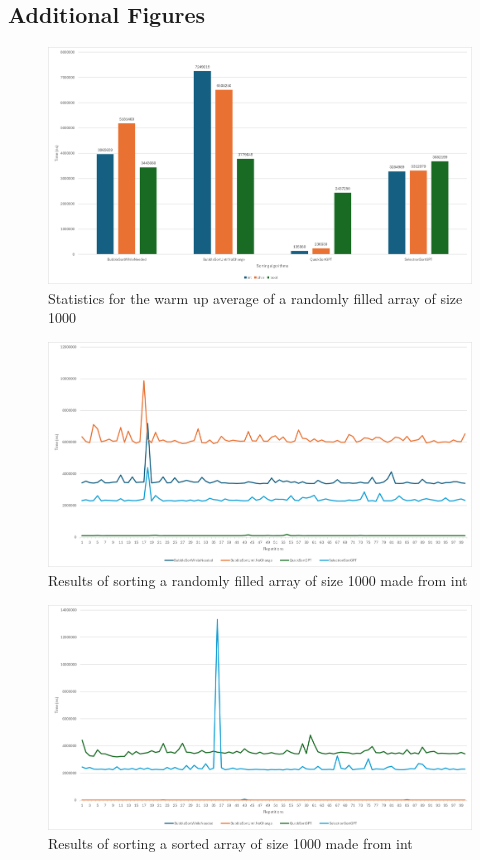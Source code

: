 \documentclass{article}
\begin{document}
\subsection{Additional Figures}\label{subchap:graphs}
\begin{figure}[!h]
    \centering
    \includegraphics[width=0.75\linewidth]{warmup_avg_1000.png}
    \caption{Statistics for the warm up average of a randomly filled array of size 1000}
    \label{fig:warmup_avg_1000_random}
\end{figure}


\begin{figure}[!h]
    \centering
    \includegraphics[width=0.7\linewidth]{int_1000_random.png}
    \caption{Results of sorting a randomly filled array of size 1000 made from int}
    \label{fig:int_1000_random}
\end{figure}

\begin{figure}[!h]
    \centering
    \includegraphics[width=0.7\linewidth]{int_1000_sorted.png}
    \caption{Results of sorting a sorted array of size 1000 made from int}
    \label{fig:int_1000_sorted}
\end{figure}
\end{document}

